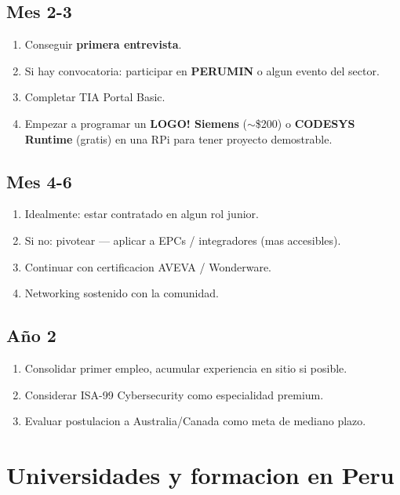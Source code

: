 \documentclass[11pt,a4paper,oneside]{report}
\begin{document}
\section{Mes 2-3}

\begin{enumerate}[leftmargin=2em]
  \item Conseguir \textbf{primera entrevista}.
  \item Si hay convocatoria: participar en \textbf{PERUMIN} o algun evento del sector.
  \item Completar TIA Portal Basic.
  \item Empezar a programar un \textbf{LOGO! Siemens} ($\sim$\$200) o \textbf{CODESYS Runtime} (gratis) en una RPi
        para tener proyecto demostrable.
\end{enumerate}

\section{Mes 4-6}

\begin{enumerate}[leftmargin=2em]
  \item Idealmente: estar contratado en algun rol junior.
  \item Si no: pivotear --- aplicar a EPCs / integradores (mas accesibles).
  \item Continuar con certificacion AVEVA / Wonderware.
  \item Networking sostenido con la comunidad.
\end{enumerate}

\section{Año 2}

\begin{enumerate}[leftmargin=2em]
  \item Consolidar primer empleo, acumular experiencia en sitio si posible.
  \item Considerar ISA-99 Cybersecurity como especialidad premium.
  \item Evaluar postulacion a Australia/Canada como meta de mediano plazo.
\end{enumerate}

\chapter{Universidades y formacion en Peru}
\end{document}
